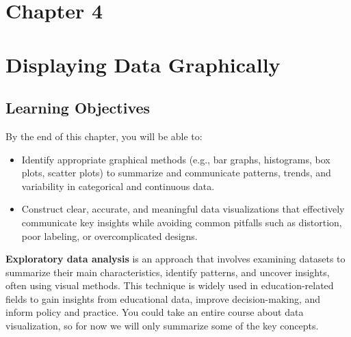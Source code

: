 \documentclass[
  letterpaper,
  DIV=11,
  numbers=noendperiod]{scrreprt}
\begin{document}

\chapter{Chapter 4}\label{chapter-4}


\chapter*{Displaying Data
Graphically}\label{displaying-data-graphically}


\section*{Learning Objectives}\label{learning-objectives-3}


By the end of this chapter, you will be able to:

\begin{itemize}
\item
  Identify appropriate graphical methods (e.g., bar graphs, histograms,
  box plots, scatter plots) to summarize and communicate patterns,
  trends, and variability in categorical and continuous data.
\item
  Construct clear, accurate, and meaningful data visualizations that
  effectively communicate key insights while avoiding common pitfalls
  such as distortion, poor labeling, or overcomplicated designs.
\end{itemize}

\textbf{Exploratory data analysis} is an approach that involves
examining datasets to summarize their main characteristics, identify
patterns, and uncover insights, often using visual methods. This
technique is widely used in education-related fields to gain insights
from educational data, improve decision-making, and inform policy and
practice. You could take an entire course about data visualization, so
for now we will only summarize some of the key concepts.
\end{document}
